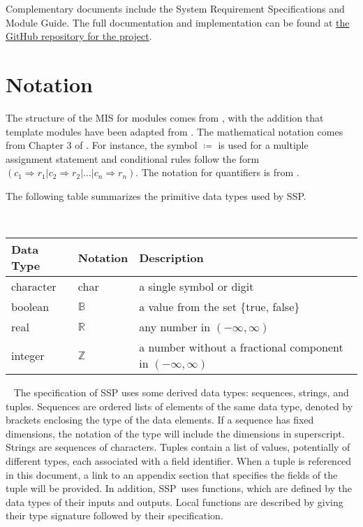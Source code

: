 \documentclass[12pt, titlepage]{article}
\newcommand{\progname}{SSP}
\begin{document}
Complementary documents include the System Requirement Specifications
and Module Guide.  The full documentation and implementation can be
found at 
\href{https://github.com/smiths/caseStudies/tree/master/CaseStudies/ssp}
{the GitHub repository for the project}.


\section{Notation}

The structure of the MIS for modules comes from \citet{HoffmanAndStrooper1995},
with the addition that template modules have been adapted from
\cite{GhezziEtAl2003}.  The mathematical notation comes from Chapter 3 of
\citet{HoffmanAndStrooper1995}.  For instance, the symbol $\coloneqq$ is used 
for a multiple assignment statement and conditional rules follow the form $(c_1
\Rightarrow r_1 | c_2 \Rightarrow r_2 | \dots | c_n \Rightarrow r_n )$. The 
notation for quantifiers is from \citet{GriesAndSchneider1993}.

The following table summarizes the primitive data types used by \progname.

~\newline \renewcommand*{\arraystretch}{1.5}
\begin{tabular}{p{} p{} p{}}
  \hline \textbf{Data Type} & \textbf{Notation} & \textbf{Description}
  \\ \hline
  
  character & char & a single symbol or digit\\

  boolean & $\mathbb{B}$ & a value from the set \{true, false\}\\
  
  real & $\mathbb{R}$ & any number in $\left( -\infty, \infty \right)$\\
  
  integer & $\mathbb{Z}$ & a number without a fractional component in $\left( 
  -\infty, \infty \right)$\\
  \bottomrule
\end{tabular}

~\newline
The specification of \progname{} uses some derived data types: sequences, 
strings, and tuples. Sequences are ordered lists of elements of the same data 
type, denoted by brackets enclosing the type of the data elements. If a 
sequence has fixed dimensions, the notation of the type will include the 
dimensions in superscript. Strings are sequences of characters. Tuples contain 
a list of values, potentially of different types, each associated with a field 
identifier. When a tuple is referenced in this document, a link to an appendix 
section that specifies the fields of the tuple will be provided. In addition, 
\progname \ uses functions, which are defined by the data types of their inputs 
and outputs. Local functions are described by giving their type signature 
followed by their specification.
\end{document}

